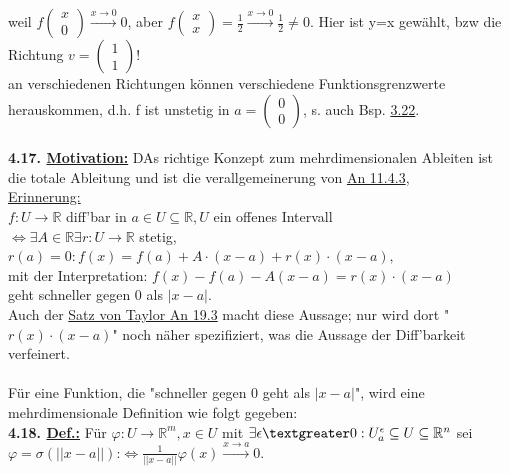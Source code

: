 \documentclass[]{scrartcl}
\begin{document}
weil $f\begin{pmatrix}
	x\\0
\end{pmatrix}\xrightarrow{x\rightarrow0}0$, aber $ f\begin{pmatrix}
	x\\x
\end{pmatrix}=\frac{1}{2}\xrightarrow{x\rightarrow0}\frac{1}{2}\neq0.$ Hier ist 
y=x gewählt, bzw die Richtung $v=\begin{pmatrix}
	1\\1
\end{pmatrix}!$\\
an verschiedenen Richtungen können verschiedene Funktionsgrenzwerte 
herauskommen, d.h. f ist unstetig in $a=\begin{pmatrix}
	0\\0
\end{pmatrix}$,  s. auch Bsp. \ul{3.22}.\\
\\
\textbf{4.17. \underline{Motivation:}} DAs richtige Konzept zum 
mehrdimensionalen Ableiten ist die totale Ableitung und ist die 
verallgemeinerung von \ul{An 11.4.3},\\
\underline{Erinnerung:}\\
$f:U\rightarrow\mathbb{R}$ diff'bar in $a\in U\subseteq\mathbb{R}, U$ ein 
offenes Intervall\\
$\Leftrightarrow \exists A\in\mathbb{R} \exists r:U\rightarrow \mathbb{R}$ 
stetig, $r(a)= 0: f(x)=f(a)+A\cdot(x-a)+r(x)\cdot(x-a),$\\
mit der Interpretation: $f(x)-f(a)-A(x-a)=r(x)\cdot(x-a)$\\
geht schneller gegen 0 als $|x-a|$.\\
Auch der \ul{Satz von  Taylor An 19.3} macht diese Aussage; nur wird dort 
"$r(x)\cdot(x-a)$" noch näher spezifiziert, was die Aussage der Diff'barkeit 
verfeinert.\\
\\
Für eine Funktion, die "schneller gegen 0 geht als $|x-a|$", wird eine 
mehrdimensionale Definition wie folgt gegeben:\\
\textbf{4.18. \underline{Def.:}} Für $\varphi:U\rightarrow\mathbb{R}^m, x\in U$ 
mit $\exists\epsilon\textgreater0:U_a^\epsilon\subseteq U\subseteq\mathbb{R}^n$ 
sei\\
\ul{$\varphi=\sigma(||x-a||)$}:$\Leftrightarrow 
\frac{1}{||x-a||}$\ul{$\varphi(x)\xrightarrow{x\rightarrow 
a}0$}.\\
\end{document}
